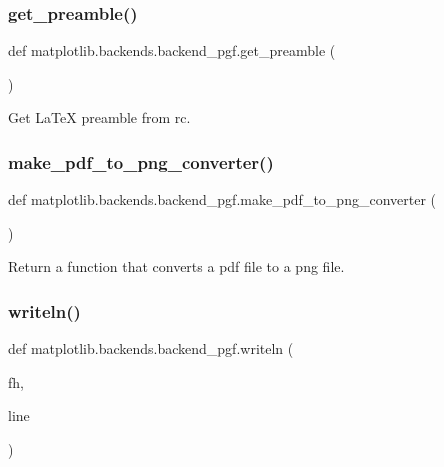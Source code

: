 \subsubsection{\texorpdfstring{get\+\_\+preamble()}{get\_preamble()}}
{\footnotesize\ttfamily def matplotlib.\+backends.\+backend\+\_\+pgf.\+get\+\_\+preamble (\begin{DoxyParamCaption}{ }\end{DoxyParamCaption})}

\begin{DoxyVerb}Get LaTeX preamble from rc.\end{DoxyVerb}
 \mbox{\label{namespacematplotlib_1_1backends_1_1backend__pgf_ad5e20809208d42c76007ad4921425f1a}} 
\subsubsection{\texorpdfstring{make\+\_\+pdf\+\_\+to\+\_\+png\+\_\+converter()}{make\_pdf\_to\_png\_converter()}}
{\footnotesize\ttfamily def matplotlib.\+backends.\+backend\+\_\+pgf.\+make\+\_\+pdf\+\_\+to\+\_\+png\+\_\+converter (\begin{DoxyParamCaption}{ }\end{DoxyParamCaption})}

\begin{DoxyVerb}Return a function that converts a pdf file to a png file.\end{DoxyVerb}
 \mbox{\label{namespacematplotlib_1_1backends_1_1backend__pgf_a4697db49093c58fcb38cd7a9a0e9cfe3}} 
\subsubsection{\texorpdfstring{writeln()}{writeln()}}
{\footnotesize\ttfamily def matplotlib.\+backends.\+backend\+\_\+pgf.\+writeln (\begin{DoxyParamCaption}\item[{}]{fh,  }\item[{}]{line }\end{DoxyParamCaption})}



